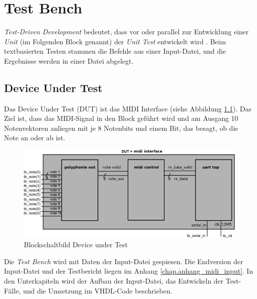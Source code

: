 
\chapter{Test Bench}\label{chap.testen}

\textit{Test-Driven Development} bedeutet, dass vor oder parallel zur Entwicklung einer \textit{Unit} (im Folgenden Block genannt) der \textit{Unit Test} entwickelt wird \citep{Testdriven}. Beim textbasierten Testen stammen die Befehle aus einer Input-Datei, und die Ergebnisse werden in einer Datei abgelegt. 

\section{Device Under Test}\label{sec.testbench_DUT}

Das Device Under Test (DUT) ist das MIDI Interface (siehe Abbildung \ref{fig.testbench}). Das Ziel ist, dass das MIDI-Signal in den Block geführt wird und am Ausgang 10 Notenvektoren anliegen mit je 8 Notenbits und einem Bit, das besagt, ob die Note an oder ab ist.

\begin{figure}[H]
	\includegraphics[width=1\textwidth]{images/midi_interface/testbench_midiinterface.png}
	\caption{Blockschaltbild Device under Test}
	\label{fig.testbench}
\end{figure} 

Die \textit{Test Bench} wird mit Daten der Input-Datei gespiesen. Die Endversion der Input-Datei und der Testbericht liegen im Anhang \ref{chap.anhang_midi_input}. 
In den Unterkapiteln wird der Aufbau der Input-Datei, das Entwickeln der Test-Fälle, und die Umsetzung im VHDL-Code beschrieben.

